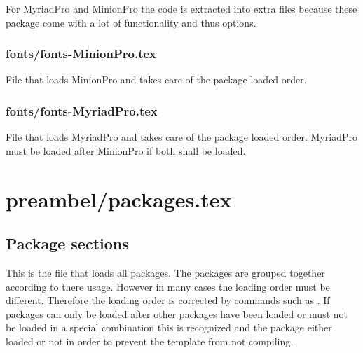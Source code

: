 For MyriadPro and MinionPro the code is extracted into extra files %
because these package come with a lot of functionality and thus options.


\subsubsection{fonts/fonts-MinionPro.tex}
File that loads MinionPro and takes care of the package loaded order.


\subsubsection{fonts/fonts-MyriadPro.tex}
File that loads MyriadPro and takes care of the package loaded order. MyriadPro must be loaded after MinionPro if both shall be loaded.


\section{preambel/packages.tex}

\subsection{Package sections}

This is the file that loads all packages. The packages are grouped together according to there usage. However in many cases the loading order must be different. Therefore the loading order is corrected by commands such as . If packages can only be loaded after other packages have been loaded or must not be loaded in a special combination this is recognized and the package either loaded or not in order to prevent the template from not compiling. 


